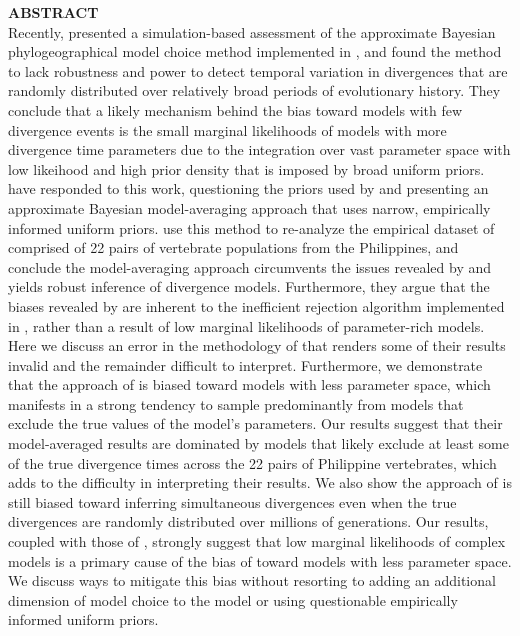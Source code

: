 \documentclass[letterpaper,12pt]{article}
\begin{document}
\begin{linenumbers}
{\sffamily
    \noindent\textbf{ABSTRACT} \\
    \noindent Recently, \citet{Oaks2012} presented a simulation-based
    assessment of the approximate Bayesian phylogeographical model choice
    method implemented in \msb, and found the method to lack robustness and
    power to detect temporal variation in divergences that are randomly
    distributed over relatively broad periods of evolutionary history.
    They conclude that a likely mechanism behind the bias toward models with
    few divergence events is the small marginal likelihoods of models with more
    divergence time parameters due to the integration over vast parameter space
    with low likeihood and high prior density that is imposed by broad uniform
    priors.
    \citet{Hickerson2013} have responded to this work, questioning the priors
    used by \citet{Oaks2012} and presenting an approximate Bayesian
    model-averaging approach that uses narrow, empirically informed uniform
    priors.
    \citet{Hickerson2013} use this method to re-analyze the empirical dataset
    of \citet{Oaks2012} comprised of 22 pairs of vertebrate populations from
    the Philippines, and conclude the model-averaging approach circumvents the
    issues revealed by \citet{Oaks2012} and yields robust inference of
    divergence models.
    Furthermore, they argue that the biases revealed by \citet{Oaks2012} are
    inherent to the inefficient rejection algorithm implemented in \msb, rather
    than a result of low marginal likelihoods of parameter-rich models.
    Here we discuss an error in the methodology of \citet{Hickerson2013} that
    renders some of their results invalid and the remainder difficult to
    interpret.
    Furthermore, we demonstrate that the approach of \citet{Hickerson2013} is
    biased toward models with less parameter space, which manifests in a strong
    tendency to sample predominantly from models that exclude the true values
    of the model's parameters.
    Our results suggest that their model-averaged results are dominated by
    models that likely exclude at least some of the true divergence times
    across the 22 pairs of Philippine vertebrates, which adds to the
    difficulty in interpreting their results.
    We also show the approach of \citet{Hickerson2013} is still biased toward
    inferring simultaneous divergences even when the true divergences are
    randomly distributed over millions of generations.
    Our results, coupled with those of \citet{Oaks2012}, strongly suggest that
    low marginal likelihoods of complex models is a primary cause of the bias
    of \msb toward models with less parameter space.
    We discuss ways to mitigate this bias without resorting to adding an
    additional dimension of model choice to the model or using questionable
    empirically informed uniform priors.

}
\end{linenumbers}
\end{document}

